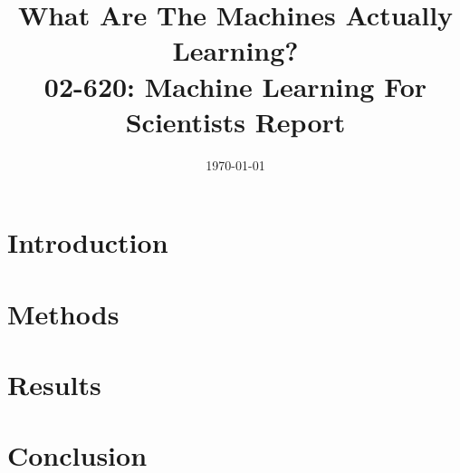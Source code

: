 

\title{What Are The Machines Actually Learning?\\
        \large 02-620: Machine Learning For Scientists Report}
\date{\today}


\maketitle
\section{Introduction}

\section{Methods}

\section{Results}

\section{Conclusion}

\printbibliography


